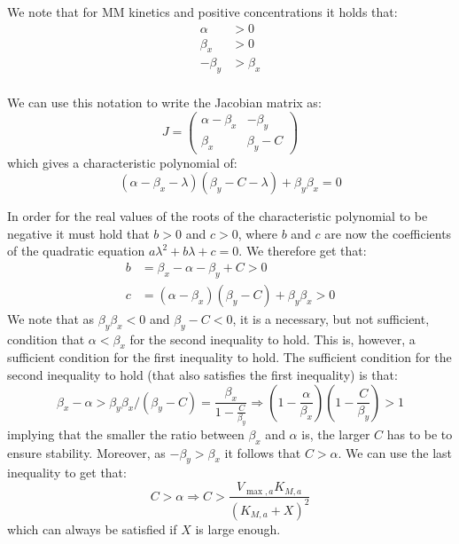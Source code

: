 We note that for MM kinetics and positive concentrations it holds that:
    \begin{align*}
        \alpha & >0 \\
        \beta_x & >0 \\
        -\beta_y & >\beta_x \\
    \end{align*}

We can use this notation to write the Jacobian matrix as:
   \begin{equation*}
        J=
        \begin{pmatrix}
            \alpha-\beta_x & -\beta_y \\
            \beta_x & \beta_y-C
        \end{pmatrix}
    \end{equation*}
which gives a characteristic polynomial of:
\begin{equation*}
    (\alpha-\beta_x-\lambda)(\beta_y-C-\lambda)+\beta_y\beta_x=0
\end{equation*}

 In order for the real values of the roots of the characteristic polynomial to be negative it must hold that $b>0$ and $c>0$, where $b$ and $c$ are now the coefficients of the quadratic equation $a\lambda^2+b\lambda+c=0$.
We therefore get that:
\begin{align*}
b & =\beta_x-\alpha-\beta_y+C>0\\
c & =(\alpha-\beta_x)(\beta_y-C)+\beta_y\beta_x>0
\end{align*}
We note that as $\beta_y\beta_x<0$ and $\beta_y-C<0$, it is a necessary, but not sufficient, condition that $\alpha<\beta_x$ for the second inequality to hold.
This is, however, a sufficient condition for the first inequality to hold.
The sufficient condition for the second inequality to hold (that also satisfies the first inequality) is that:
\begin{equation*}
  \beta_x-\alpha>\beta_y\beta_x/(\beta_y-C)=\frac{\beta_x}{1-\frac{C}{\beta_y}}\Rightarrow (1-\frac{\alpha}{\beta_x})(1-\frac{C}{\beta_y})>1
\end{equation*}
implying that the smaller the ratio between $\beta_x$ and $\alpha$ is, the larger $C$ has to be to ensure stability.
Moreover, as $-\beta_y >\beta_x$ it follows that $C>\alpha$.
We can use the last inequality to get that:
\begin{equation*}
    C>\alpha \Rightarrow C>\frac{V_{\max,a}K_{M,a}}{(K_{M,a}+X)^2}
\end{equation*}
which can always be satisfied if $X$ is large enough.

